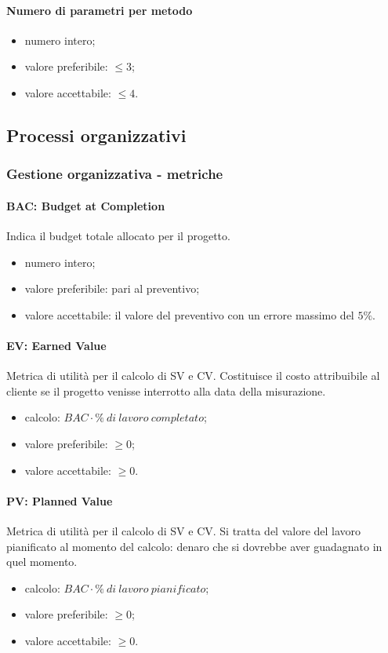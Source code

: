 		\paragraph{Numero di parametri per metodo}
		\begin{itemize}
		\item numero intero;
		\item valore preferibile: $\leq 3$;
		\item valore accettabile: $ \leq 4$.
		\end{itemize}
		
	\subsection{Processi organizzativi}
		\subsubsection{Gestione organizzativa - metriche}
		\paragraph{BAC: Budget at Completion}
		Indica il budget totale allocato per il progetto.
		\begin{itemize}
		\item numero intero;
		\item valore preferibile: pari al preventivo;
		\item valore accettabile: il valore del preventivo con un errore massimo del $5\%$.
		\end{itemize}
		
		\paragraph{EV: Earned Value}
		Metrica di utilità per il calcolo di SV e CV. Costituisce il costo attribuibile al cliente se il progetto venisse interrotto alla data della misurazione.
		\begin{itemize}
		\item calcolo: $BAC \cdot \% \  di \ lavoro \ completato$;
		\item valore preferibile: $\geq 0$;
		\item valore accettabile: $\geq 0$.
		\end{itemize}
		
		\paragraph{PV: Planned Value}
		Metrica di utilità per il calcolo di SV e CV. Si tratta del valore del lavoro pianificato al momento del calcolo: denaro che si dovrebbe aver guadagnato in quel momento.
		\begin{itemize}
		\item calcolo: $BAC \cdot \% \ di \ lavoro \ pianificato$;
		\item valore preferibile: $\geq 0$;
		\item valore accettabile: $\geq 0$.
		\end{itemize}
		
